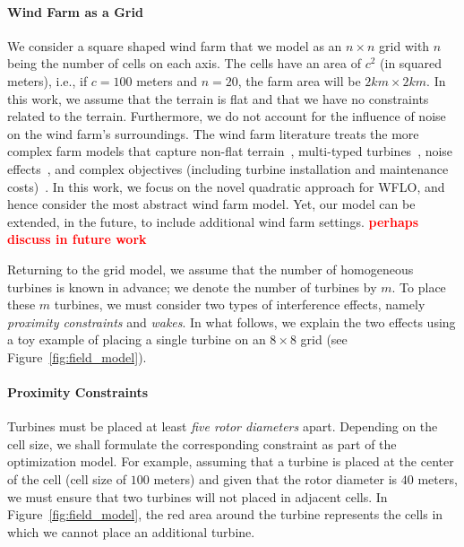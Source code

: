 \documentclass[preprint,12pt]{elsarticle}
\newcommand{\todo}[1]{{\textcolor{red}{\bf {#1}}}}
\begin{document}
\paragraph{Wind Farm as a Grid} We consider a square shaped wind farm that we model 
as an $n\times n$ grid
with $n$ being the number of cells on each axis. 
The cells have an area of $c^2$ (in squared meters), i.e.,
if $c=100$ meters and $n=20$, the farm area will be $2km\times 2km$.
In this work, we assume that the terrain is flat and that 
we have no constraints related to the terrain.
Furthermore, we do not account for the influence of noise
on the wind farm's surroundings. The wind farm literature treats the more complex
farm models that capture non-flat terrain~\cite{song2015lazy,kuo2016wind}, multi-typed turbines~\cite{feng2017design}, noise effects~\cite{Zhang2014,sorkhabi2016impact,yin2014multi}, and complex objectives (including turbine installation  and maintenance costs)~\cite{lackner2007analytical}.
In this work, we focus on the novel quadratic approach for WFLO, and hence
consider the most abstract wind farm model. Yet, our model can be extended,
in the future, to include 
additional wind farm settings. \todo{perhaps discuss in future work} 
 
Returning to the grid model, we assume that the number of homogeneous turbines is known 
in advance; we denote the number of turbines by $m$. To place these $m$ turbines, 
we must consider two types of interference effects, namely \emph{proximity constraints} and \emph{wakes}.
In what follows, we explain the two effects using a toy example of placing a single turbine on an 
$8\times8$ grid (see Figure~\ref{fig:field_model}).

\paragraph{Proximity Constraints} Turbines must be placed at least \emph{five rotor diameters} apart. Depending on the cell size, 
	we shall formulate the corresponding constraint as part of the optimization model. For example, assuming that a turbine is placed
	at the center of the cell (cell size of $100$ meters) and given that the rotor diameter is $40$ meters, 
	we must ensure that two turbines will not placed in adjacent cells. In Figure~\ref{fig:field_model}, 
	the red area around the turbine represents the cells in which we cannot place an additional turbine.
	 
\end{document}

